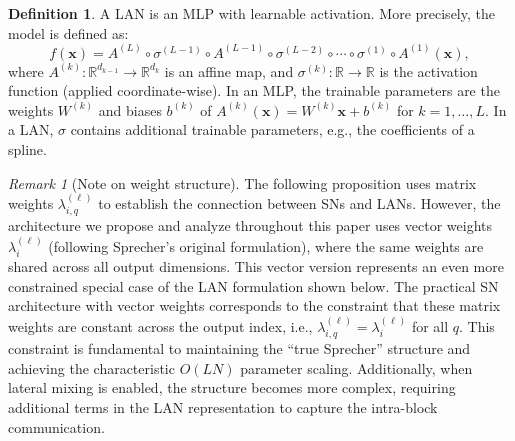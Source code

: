 \documentclass{article}
\theoremstyle{plain}
\theoremstyle{definition}
\newtheorem{definition}{Definition}
\theoremstyle{remark}
\newtheorem{remark}{Remark}
\begin{document}
\begin{definition}
A LAN is an MLP with learnable activation. More precisely, the model is defined as: 
$$
f(\mathbf{x}) = A^{(L)} \circ \sigma^{(L-1)} \circ A^{(L-1)} \circ \sigma^{(L-2)} \circ \cdots \circ \sigma^{(1)} \circ A^{(1)} (\mathbf{x}),
$$
where $A^{(k)} \colon \mathbb{R}^{d_{k-1}} \rightarrow \mathbb{R}^{d_k}$ is an affine map, and $\sigma^{(k)} \colon \mathbb{R} \rightarrow \mathbb{R}  $ is the activation function (applied coordinate-wise). In an MLP, the trainable parameters are the weights $W^{(k)}$ and biases $b^{(k)}$ of $A^{(k)}(\mathbf{x}) = W^{(k)}\mathbf{x} + b^{(k)}$ for $k = 1, \ldots, L$. In a LAN, $\sigma$ contains additional trainable parameters, e.g., the coefficients of a spline.
\end{definition}

\begin{remark}[Note on weight structure]
The following proposition uses matrix weights $\lambda_{i,q}^{(\ell)}$ to establish the connection between SNs and LANs. However, the architecture we propose and analyze throughout this paper uses vector weights $\lambda_i^{(\ell)}$ (following Sprecher's original formulation), where the same weights are shared across all output dimensions. This vector version represents an even more constrained special case of the LAN formulation shown below. The practical SN architecture with vector weights corresponds to the constraint that these matrix weights are constant across the output index, i.e., $\lambda_{i,q}^{(\ell)} = \lambda_i^{(\ell)}$ for all $q$. This constraint is fundamental to maintaining the ``true Sprecher'' structure and achieving the characteristic $O(LN)$ parameter scaling. Additionally, when lateral mixing is enabled, the structure becomes more complex, requiring additional terms in the LAN representation to capture the intra-block communication.
\end{remark}
\end{document}
